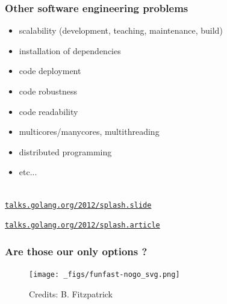 \documentclass[9pt]{beamer}
\newcommand{\myblue} [1] {{\color{blue}#1}}
\begin{document}
\begin{frame}[fragile]
\frametitle{Other software engineering problems}

	\begin{block}{}
\begin{itemize}
\item scalability (development, teaching, maintenance, build)
\item installation of dependencies
\item code deployment
\item code robustness
\item code readability
\item multicores/manycores, multithreading
\item distributed programming
\item etc...
\end{itemize}
	\end{block}{}

	\quad\\

\myblue{\href{https://talks.golang.org/2012/splash.slide}{\texttt{talks.golang.org/2012/splash.slide}}}

\myblue{\href{https://talks.golang.org/2012/splash.article}{\texttt{talks.golang.org/2012/splash.article}}}


\end{frame}

\begin{frame}[fragile]
\frametitle{Are those our only options ?}


\begin{figure}[h]
\begin{center}
\texttt{[image: \_figs/funfast-nogo\_svg.png]}
\end{center}

\caption{Credits: B. Fitzpatrick}

\end{figure}


\end{frame}
\end{document}
